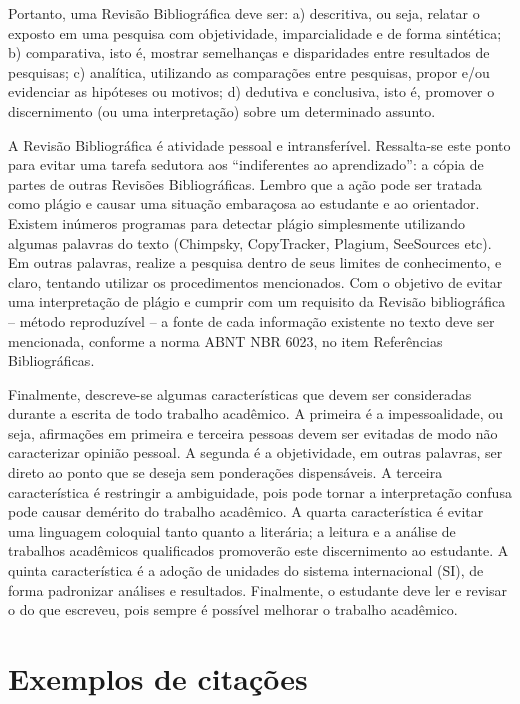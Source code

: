 Portanto, uma Revisão Bibliográfica deve ser: a) descritiva, ou seja, relatar o exposto em uma pesquisa com objetividade, imparcialidade e de forma sintética; b) comparativa, isto é, mostrar semelhanças e disparidades entre resultados de pesquisas; c) analítica, utilizando as comparações entre pesquisas, propor e/ou evidenciar as hipóteses ou motivos; d) dedutiva e conclusiva, isto é, promover o discernimento (ou uma interpretação) sobre um determinado assunto.

A Revisão Bibliográfica é atividade pessoal e intransferível. Ressalta-se este ponto para evitar uma tarefa sedutora aos “indiferentes ao aprendizado”: a cópia de partes de outras Revisões Bibliográficas. Lembro que a ação pode ser tratada como plágio e causar uma situação embaraçosa ao estudante e ao orientador. Existem inúmeros programas para detectar plágio simplesmente utilizando algumas palavras do texto (Chimpsky, CopyTracker, Plagium, SeeSources etc). Em outras palavras, realize a pesquisa dentro de seus limites de conhecimento, e claro, tentando utilizar os procedimentos mencionados. Com o objetivo de evitar uma interpretação de plágio e cumprir com um requisito da Revisão bibliográfica – método reproduzível – a fonte de cada informação existente no texto deve ser mencionada, conforme a norma ABNT NBR 6023, no item Referências Bibliográficas.

Finalmente, descreve-se algumas características que devem ser consideradas durante a escrita de todo trabalho acadêmico. A primeira é a impessoalidade, ou seja, afirmações em primeira e terceira pessoas devem ser evitadas de modo não caracterizar opinião pessoal. A segunda é a objetividade, em outras palavras, ser direto ao ponto que se deseja sem ponderações dispensáveis. A terceira característica é restringir a ambiguidade, pois pode tornar a interpretação confusa pode causar demérito do trabalho acadêmico. A quarta característica é evitar uma linguagem coloquial tanto quanto a literária; a leitura e a análise de trabalhos acadêmicos qualificados promoverão este discernimento ao estudante. A quinta característica é a adoção de unidades do sistema internacional (SI), de forma padronizar análises e resultados. Finalmente, o estudante deve ler e revisar o do que escreveu, pois sempre é possível melhorar o trabalho acadêmico.


\section{Exemplos de citações}

